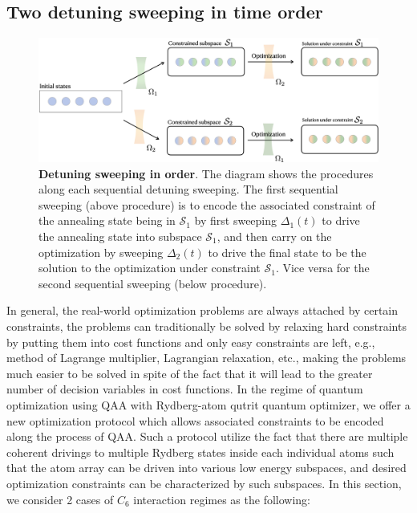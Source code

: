 \documentclass[%
 reprint,
nofootinbib,
 amsmath,amssymb,
 aps,
pra,
floatfix,
]{revtex4-2}
\begin{document}
\subsection{Two detuning sweeping in time order}

\begin{figure}[b!]
    \centering
    \includegraphics[width=12cm]{picture/opti_procedure.png}
    \caption{\textbf{Detuning sweeping in order}.  The diagram shows the procedures along each sequential detuning sweeping. The first sequential sweeping (above procedure) is to encode the associated constraint of the annealing state being in $\mathcal{S}_1$ by first sweeping $\Delta_1(t)$ to drive the annealing state into subspace $\mathcal{S}_1$, and then carry on the optimization by sweeping $\Delta_2(t)$ to drive the final state to be the solution to the optimization under constraint $\mathcal{S}_1$. Vice versa for the second sequential sweeping (below procedure).}
    \label{fig:opt_procedure}
\end{figure}
In general, the real-world optimization problems are always attached by certain constraints, the problems can traditionally be solved by relaxing hard constraints by putting them into cost functions and only easy constraints are left, e.g., method of Lagrange multiplier, Lagrangian relaxation, etc., making the problems much easier to be solved in spite of the fact that it will lead to the greater number of decision variables in cost functions. In the regime of quantum optimization using QAA with Rydberg-atom qutrit quantum optimizer, we offer a new optimization protocol which allows associated constraints to be encoded along the process of QAA. Such a protocol utilize the fact that there are multiple coherent drivings to multiple Rydberg states inside each individual atoms such that the atom array can be driven into various low energy subspaces, and desired optimization constraints can be characterized by such subspaces. In this section, we consider 2 cases of $C_6$ interaction regimes as the following:
\end{document}
